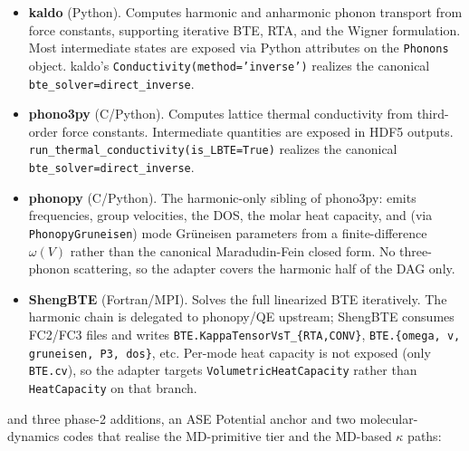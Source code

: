 \documentclass[11pt,a4paper]{article}
\begin{document}
\begin{itemize}[leftmargin=2em]
  \item \textbf{kaldo} (Python). Computes harmonic and anharmonic phonon transport from
        force constants, supporting iterative BTE, RTA, and the Wigner formulation.
        Most intermediate states are exposed via Python attributes on the
        \texttt{Phonons} object. kaldo's \texttt{Conductivity(method='inverse')}
        realizes the canonical \texttt{bte\_solver=direct\_inverse}.
  \item \textbf{phono3py} (C/Python). Computes lattice thermal conductivity from
        third-order force constants. Intermediate quantities are exposed in HDF5
        outputs. \texttt{run\_thermal\_conductivity(is\_LBTE=True)} realizes the
        canonical \texttt{bte\_solver=direct\_inverse}.
  \item \textbf{phonopy} (C/Python). The harmonic-only sibling of phono3py:
        emits frequencies, group velocities, the DOS, the molar heat capacity,
        and (via \texttt{PhonopyGruneisen}) mode Grüneisen parameters from a
        finite-difference $\omega(V)$ rather than the canonical Maradudin-Fein
        closed form. No three-phonon scattering, so the adapter covers the
        harmonic half of the DAG only.
  \item \textbf{ShengBTE} (Fortran/MPI). Solves the full linearized BTE
        iteratively. The harmonic chain is delegated to phonopy/QE upstream;
        ShengBTE consumes FC2/FC3 files and writes
        \texttt{BTE.KappaTensorVsT\_\{RTA,CONV\}}, \texttt{BTE.\{omega, v, gruneisen,
        P3, dos\}}, etc. Per-mode heat capacity is not exposed (only
        \texttt{BTE.cv}), so the adapter targets \texttt{VolumetricHeatCapacity}
        rather than \texttt{HeatCapacity} on that branch.
\end{itemize}

\noindent and three phase-2 additions, an ASE Potential anchor and two
molecular-dynamics codes that realise the MD-primitive tier and the MD-based
$\kappa$ paths:
\end{document}
